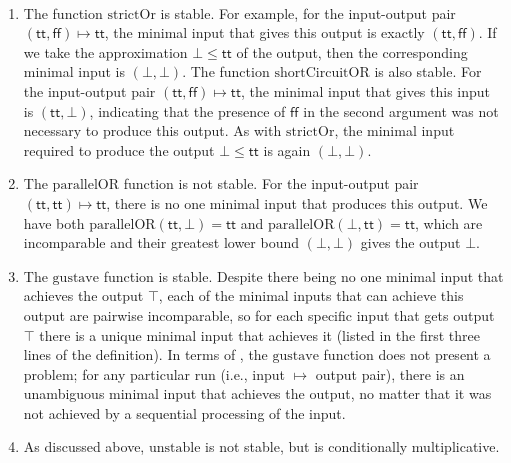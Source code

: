 \begin{example}\label{ex:stable-functions}
  \leavevmode\\[-3ex]
  \begin{enumerate}[leftmargin=\enummargin]
  \item The function $\mathrm{strictOr}$ is stable. For example, for
    the input-output pair
    $(\mathsf{tt},\mathsf{ff}) \mapsto \mathsf{tt}$, the minimal input
    that gives this output is exactly $(\mathsf{tt}, \mathsf{ff})$. If
    we take the approximation $\bot \leq \mathsf{tt}$ of the output,
    then the corresponding minimal input is $(\bot, \bot)$. The
    function $\mathrm{shortCircuitOR}$ is also stable. For the
    input-output pair $(\mathsf{tt},\mathsf{ff}) \mapsto \mathsf{tt}$,
    the minimal input that gives this input is $(\mathsf{tt},\bot)$,
    indicating that the presence of $\mathsf{ff}$ in the second
    argument was not necessary to produce this output. As with
    $\mathrm{strictOr}$, the minimal input required to produce the
    output $\bot \leq \mathsf{tt}$ is again $(\bot,\bot)$.

  \item The $\mathrm{parallelOR}$ function is not stable. For the
    input-output pair $(\mathsf{tt},\mathsf{tt}) \mapsto \mathsf{tt}$,
    there is no one minimal input that produces this output. We have
    both $\mathrm{parallelOR}(\mathsf{tt},\bot) = \mathsf{tt}$ and
    $\mathrm{parallelOR}(\bot,\mathsf{tt}) = \mathsf{tt}$, which are
    incomparable and their greatest lower bound $(\bot,\bot)$ gives
    the output $\bot$.

  \item The $\mathrm{gustave}$ function is stable. Despite there being
    no one minimal input that achieves the output $\top$, each of the
    minimal inputs that can achieve this output are pairwise
    incomparable, so for each specific input that gets output $\top$
    there is a unique minimal input that achieves it (listed in the
    first three lines of the definition). %
%
    In terms of \GPS, the $\mathrm{gustave}$ function does not present
    a problem; for any particular run (i.e., input $\mapsto$ output
    pair), there is an unambiguous minimal input that achieves the
    output, no matter that it was not achieved by a sequential
    processing of the input.

  \item As discussed above, $\mathrm{unstable}$ is not stable, but is
    conditionally multiplicative.


\end{enumerate}
\end{example}
